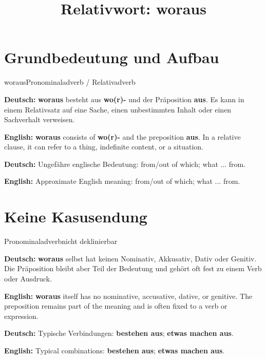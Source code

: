 \documentclass[a4paper,11pt]{article}
\title{Relativwort: \glqq woraus\grqq{}}
\date{}
\newcommand{\GermanText}[1]{\textbf{Deutsch: }#1\par}
\newcommand{\EnglishText}[1]{{\small\color{SoftGray}\textbf{English: }#1\par}}
\begin{document}
\maketitle

\tableofcontents

\newpage

\section{Grundbedeutung und Aufbau}

\begin{grammarentry}{woraus}{Pronominaladverb / Relativadverb}

\GermanText{\textbf{woraus} besteht aus \textbf{wo(r)-} und der Präposition \textbf{aus}. Es kann in einem Relativsatz auf eine Sache, einen unbestimmten Inhalt oder einen Sachverhalt verweisen.}

\EnglishText{\textbf{woraus} consists of \textbf{wo(r)-} and the preposition \textbf{aus}. In a relative clause, it can refer to a thing, indefinite content, or a situation.}

\GermanText{Ungefähre englische Bedeutung: \glqq from/out of which; what ... from\grqq{}.}

\EnglishText{Approximate English meaning: \glqq from/out of which; what ... from\grqq{}.}

\end{grammarentry}

\section{Keine Kasusendung}

\begin{grammarentry}{Pronominaladverb}{nicht deklinierbar}

\GermanText{\textbf{woraus} selbst hat keinen Nominativ, Akkusativ, Dativ oder Genitiv. Die Präposition bleibt aber Teil der Bedeutung und gehört oft fest zu einem Verb oder Ausdruck.}

\EnglishText{\textbf{woraus} itself has no nominative, accusative, dative, or genitive. The preposition remains part of the meaning and is often fixed to a verb or expression.}

\GermanText{Typische Verbindungen: \textbf{bestehen aus}; \textbf{etwas machen aus}.}

\EnglishText{Typical combinations: \textbf{bestehen aus}; \textbf{etwas machen aus}.}

\end{grammarentry}
\end{document}
